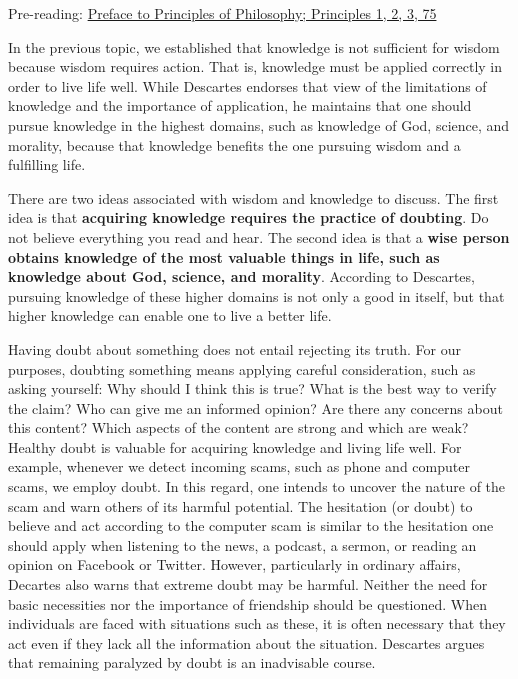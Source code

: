 \documentclass[
]{book}
\begin{document}
\begin{reflect}
Pre-reading: \href{assets/u1/PrinciplesofPhilosophy.pdf}{Preface to Principles of Philosophy; Principles 1, 2, 3, 75}
\end{reflect}

In the previous topic, we established that knowledge is not sufficient for wisdom because wisdom requires action. That is, knowledge must be applied correctly in order to live life well. While Descartes endorses that view of the limitations of knowledge and the importance of application, he maintains that one should pursue knowledge in the highest domains, such as knowledge of God, science, and morality, because that knowledge benefits the one pursuing wisdom and a fulfilling life.

There are two ideas associated with wisdom and knowledge to discuss. The first idea is that \textbf{acquiring knowledge requires the practice of doubting}. Do not believe everything you read and hear. The second idea is that a \textbf{wise person obtains knowledge of the most valuable things in life, such as knowledge about God, science, and morality}. According to Descartes, pursuing knowledge of these higher domains is not only a good in itself, but that higher knowledge can enable one to live a better life.

Having doubt about something does not entail rejecting its truth. For our purposes, doubting something means applying careful consideration, such as asking yourself: Why should I think this is true? What is the best way to verify the claim? Who can give me an informed opinion? Are there any concerns about this content? Which aspects of the content are strong and which are weak? Healthy doubt is valuable for acquiring knowledge and living life well. For example, whenever we detect incoming scams, such as phone and computer scams, we employ doubt. In this regard, one intends to uncover the nature of the scam and warn others of its harmful potential. The hesitation (or doubt) to believe and act according to the computer scam is similar to the hesitation one should apply when listening to the news, a podcast, a sermon, or reading an opinion on Facebook or Twitter. However, particularly in ordinary affairs, Decartes also warns that extreme doubt may be harmful. Neither the need for basic necessities nor the importance of friendship should be questioned. When individuals are faced with situations such as these, it is often necessary that they act even if they lack all the information about the situation. Descartes argues that remaining paralyzed by doubt is an inadvisable course.
\end{document}
